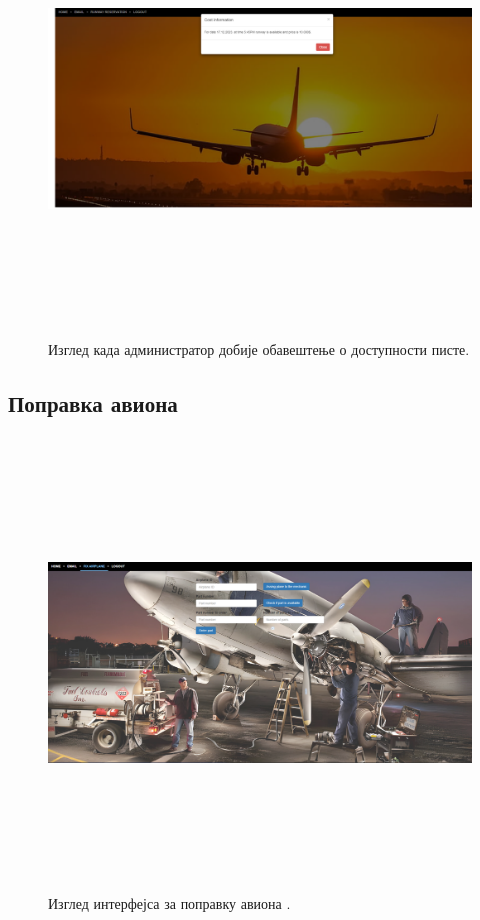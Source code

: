 \documentclass{article}
\begin{document}
\begin{figure}[H]
    \begin{center}
        \includegraphics[width=1.1\textwidth, height=12cm]{Dizajn/runway_availability.png}
        \caption{Изглед када администратор добије обавештење о доступности писте.}
    \end{center}
\end{figure}

\subsection{Поправка авиона}

\begin{figure}[H]
    \begin{center}
        \includegraphics[width=1.1\textwidth, height=12cm]{Dizajn/popravka_aviona.png}
        \caption{Изглед интерфејса за поправку авиона   .}
    \end{center}
\end{figure}


\newpage

 
\end{document}
